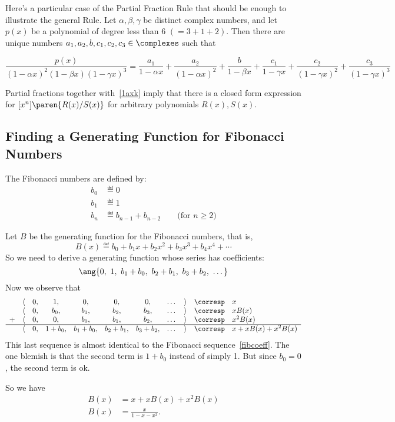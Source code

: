 \documentclass[handout]{mcs}
\begin{document}
Here's a particular case of the Partial Fraction Rule that should be
enough to illustrate the general Rule.  Let $\alpha, \beta, \gamma$ be
distinct complex numbers, and let $p(x)$ be a polynomial of degree less
than 6 $(= 3+1+2)$.  Then there are unique numbers $a_1,a_2,b,c_1,c_2,c_3
\in \complexes$ such that

\[
\frac{p(x)}{(1-\alpha x)^2 (1-\beta x) (1-\gamma x)^3}
= \frac{a_1}{1-\alpha x} + \frac{a_2}{(1-\alpha x)^2}
+ \frac{b}{1-\beta x}
+ \frac{c_1}{1-\gamma x} + \frac{c_2}{(1-\gamma x)^2} + \frac{c_3}{(1-\gamma x)^3}
\]

Partial fractions together with~\eqref{1axk} imply that there is a closed
form expression for $[x^n]\paren{R(x)/S(x)}$ for arbitrary polynomials
$R(x),S(x)$.

\subsection{Finding a Generating Function for Fibonacci Numbers}
The Fibonacci numbers are defined by:
\begin{align*}
b_0 & \eqdef 0 \\
b_1 & \eqdef 1 \\
b_n & \eqdef b_{n-1} + b_{n-2} \qquad \text{(for $n \geq 2$)}
\end{align*}

Let $B$ be the generating function for the Fibonacci numbers, that is,
\[
B(x) \eqdef b_0 + b_1 x + b_2 x^2 + b_3 x^3 + b_4 x^4 + \cdots
\]
So we need to derive a generating function whose series has coefficients:
\begin{equation}\label{fibcoeff}
\ang{0,\ 1,\ b_1 + b_0,\ b_2 + b_1,\ b_3 + b_2,\ \dots}
\end{equation}
Now we observe that
\[
\begin{array}{ccccccccccl}
  & \langle & 0, & 1, & 0, & 0, & 0, & \dots & \rangle
    & \corresp & x \\
  & \langle & 0, & b_0, & b_1, & b_2, & b_3, & \dots & \rangle
    & \corresp & x B(x) \\
+ & \langle & 0, & 0, & b_0, & b_1, & b_2, & \dots & \rangle
    & \corresp & x^2 B(x) \\ \hline
  & \langle & 0, & 1 + b_0, & b_1 + b_0, & b_2 + b_1, & b_3 + b_2, & \dots & \rangle
    & \corresp & x + x B(x) + x^2 B(x) \\
\end{array}
\]
%
This last sequence is almost identical to the Fibonacci
sequence~\eqref{fibcoeff}.  The one blemish is that the second term is $1
+ b_0$ instead of simply 1.  But since $b_0 = 0$, the second term is ok.

So we have
\begin{align*}
B(x) & = x + x B(x) + x^2 B(x)\\
B(x) & = \frac{x}{1 - x - x^2}.
\end{align*}
\end{document}
